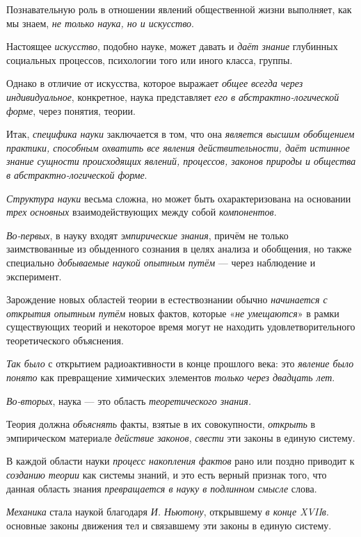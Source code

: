 \documentclass[a4paper,14pt,russian]{extreport}
\begin{document}
Познавательную роль в отношении явлений общественной жизни выполняет, как мы знаем, \emph{не только наука, но и искусство}.

Настоящее \emph{искусство}, подобно науке, может давать и \emph{даёт знание} глубинных социальных процессов, психологии того или иного класса, группы.

Однако в отличие от искусства, которое выражает \emph{общее всегда через индивидуальное}, конкретное, наука представляет \emph{его в абстрактно-логической форме}, через понятия, теории.

Итак, \emph{специфика науки} заключается в том, что она \emph{является высшим обобщением практики, способным охватить все явления действительности, даёт истинное знание сущности происходящих явлений, процессов, законов природы и общества в абстрактно-логической форме}.

\emph{Структура науки} весьма сложна, но может быть охарактеризована на основании \emph{трех основных} взаимодействующих между собой \emph{компонентов}.

\emph{Во-первых}, в науку входят \emph{эмпирические знания}, причём не только заимствованные из обыденного сознания в целях анализа и обобщения, но также специально \emph{добываемые наукой опытным путём} --- через наблюдение и эксперимент.

Зарождение новых областей теории в естествознании обычно \emph{начинается с} \emph{открытия опытным путём} новых фактов, которые «\emph{не умещаются}» в рамки существующих теорий и некоторое время могут не находить удовлетворительного теоретического объяснения.

\emph{Так было} с открытием радиоактивности в конце прошлого века: это \emph{явление было понято} как превращение химических элементов \emph{только через двадцать лет}.

\emph{Во-вторых}, наука --- это область \emph{теоретического знания.}

Теория должна \emph{объяснять} факты, взятые в их совокупности, \emph{открыть} в эмпирическом материале \emph{действие законов}, \emph{свести} эти законы в единую систему.

В каждой области науки \emph{процесс накопления фактов} рано или поздно приводит к \emph{созданию теории} как системы знаний, и это есть верный признак того, что данная область знания \emph{превращается в науку в подлинном смысле} слова.

\emph{Механика} стала наукой благодаря \emph{И. Ньютону}, открывшему \emph{в конце XVIIв}. основные законы движения тел и связавшему эти законы в единую систему.
\end{document}
